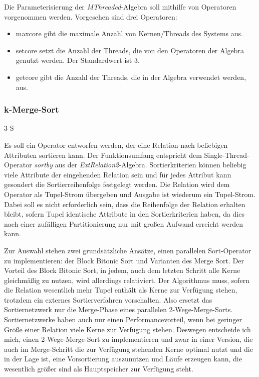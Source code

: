 \documentclass[a4paper,12pt,twoside]{article}
\newcommand{\Fb}[1]{\textit{#1}} %
\begin{document}
Die Parameterisierung der \Fb{MThreaded}-Algebra soll mithilfe von Operatoren vorgenommen werden. Vorgesehen sind drei Operatoren:

\begin{itemize}
	\item maxcore gibt die maximale Anzahl von Kernen/Threads des Systems aus.
	\item setcore setzt die Anzahl der Threads, die von den Operatoren der Algebra genutzt werden. Der Standardwert ist 3.
	\item getcore gibt die Anzahl der Threads, die in der Algebra verwendet werden, aus.
\end{itemize}

\subsubsection{k-Merge-Sort} 3 S
\label{entw:sort}

Es soll ein Operator entworfen werden, der eine Relation nach beliebigen Attributen sortieren kann. Der Funktionsumfang entspricht dem Single-Thread-Operator \Fb{sortby} aus der \Fb{ExtRelation2}-Algebra. Sortierkriterien können beliebig viele Attribute der eingehenden Relation sein und für jedes Attribut kann gesondert die Sortierreihenfolge festgelegt werden. Die Relation wird dem Operator als Tupel-Strom übergeben und Ausgabe ist wiederum ein Tupel-Strom. Dabei soll es nicht erforderlich sein, dass die Reihenfolge der Relation erhalten bleibt, sofern Tupel identische Attribute in den Sortierkriterien haben, da dies nach einer zufälligen Partitionierung nur mit großen Aufwand erreicht werden kann.

Zur Auswahl stehen zwei grundsätzliche Ansätze, einen parallelen Sort-Operator zu implementieren: der Block Bitonic Sort und Varianten des Merge Sort. Der Vorteil des Block Bitonic Sort, in jedem, auch dem letzten Schritt alle Kerne gleichmäßig zu nutzen, wird allerdings relativiert. Der Algorithmus muss, sofern die Relation wesentlich mehr Tupel enthält als Kerne zur Verfügung stehen, trotzdem ein externes Sortierverfahren vorschalten. Also ersetzt das Sortiernetzwerk nur die Merge-Phase eines parallelen 2-Wege-Merge-Sorts. Sortiernetzwerke haben auch nur einen Performancevorteil, wenn bei geringer Größe einer Relation viele Kerne zur Verfügung stehen. Deswegen entscheide ich mich, einen 2-Wege-Merge-Sort zu implementieren und zwar in einer Version, die auch im Merge-Schritt die zur Verfügung stehenden Kerne optimal nutzt und die in der Lage ist, eine Vorsortierung auszunutzen und Läufe erzeugen kann, die wesentlich größer sind als Hauptspeicher zur Verfügung steht.
\end{document}
